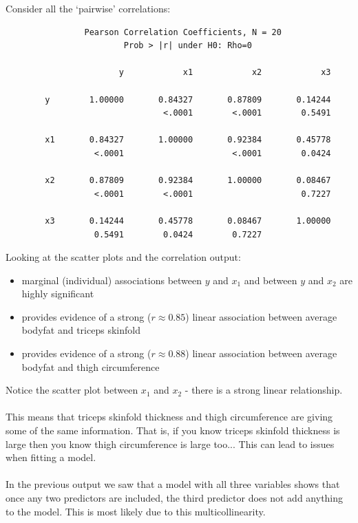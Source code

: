 \newpage

Consider all the `pairwise' correlations:

\normalsize
\begin{verbatim}
                Pearson Correlation Coefficients, N = 20 
                        Prob > |r| under H0: Rho=0
 
                       y            x1            x2            x3

        y        1.00000       0.84327       0.87809       0.14244
                                <.0001        <.0001        0.5491

        x1       0.84327       1.00000       0.92384       0.45778
                  <.0001                      <.0001        0.0424

        x2       0.87809       0.92384       1.00000       0.08467
                  <.0001        <.0001                      0.7227

        x3       0.14244       0.45778       0.08467       1.00000
                  0.5491        0.0424        0.7227              
\end{verbatim}
\large

Looking at the scatter plots and the correlation output:
\begin{itemize}
\item marginal (individual) associations between $y$ and $x_1$ and between $y$ and $x_2$ are highly significant
\item provides evidence of a strong ($r\approx 0.85$) linear association between average bodyfat and triceps skinfold
\item provides evidence of a strong ($r\approx 0.88$) linear association between average bodyfat and thigh circumference
\end{itemize}

Notice the scatter plot between $x_1$ and $x_2$ - there is a strong linear relationship.  \\~\\
This means that triceps skinfold thickness and thigh circumference are giving some of the same information.   That is, if you know triceps skinfold thickness is large then you know thigh circumference is large too... This can lead to issues when fitting a model.\\~\\

In the previous output we saw that a model with all three variables shows that once any two predictors are included, the third predictor does not add anything to the model.  This is most likely due to this multicollinearity.\\~\\

